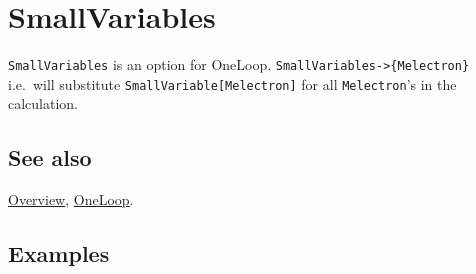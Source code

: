 \documentclass[../FeynCalcManual.tex]{subfiles}
\begin{document}
\hypertarget{smallvariables}{%
\section{SmallVariables}\label{smallvariables}}

\texttt{SmallVariables} is an option for OneLoop.
\texttt{SmallVariables->\{\allowbreak{}Melectron\}} i.e.~will substitute
\texttt{SmallVariable[\allowbreak{}Melectron]} for all
\texttt{Melectron}'s in the calculation.

\subsection{See also}

\hyperlink{toc}{Overview}, \hyperlink{oneloop}{OneLoop}.

\subsection{Examples}
\end{document}
